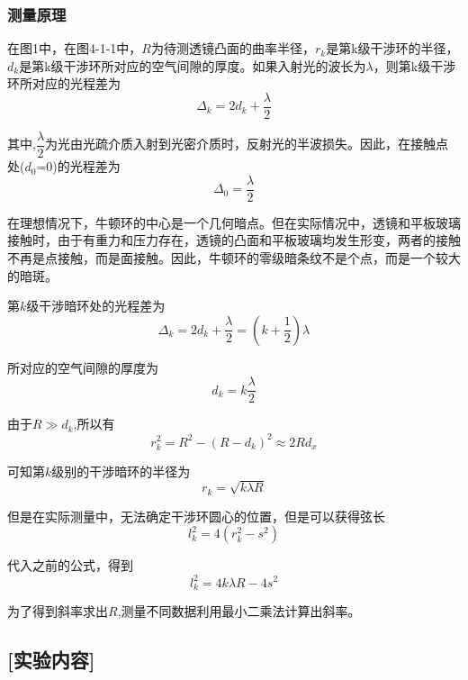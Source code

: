 \documentclass[12pt,a4paper,UTF8]{ctexart}
\begin{document}
\subsubsection*{测量原理}
\par 在图1中，在图4-1-1中，$R$为待测透镜凸面的曲率半径，$r_k$是第k级干涉环的半径，$d_k$是第k级干涉环所对应的空气间隙的厚度。如果入射光的波长为$\lambda$，则第k级干涉环所对应的光程差为
\[
	\Delta_k = 2d_k+\frac{\lambda}{2}
\]
\clearpage
\par 其中,$\dfrac{\lambda}{2}$为光由光疏介质入射到光密介质时，反射光的半波损失。因此，在接触点处($d_0$=0)的光程差为
\[
	\Delta_0 = \frac{\lambda}{2}
\]
\par 在理想情况下，牛顿环的中心是一个几何暗点。但在实际情况中，透镜和平板玻璃接触时，由于有重力和压力存在，透镜的凸面和平板玻璃均发生形变，两者的接触不再是点接触，而是面接触。因此，牛顿环的零级暗条纹不是个点，而是一个较大的暗斑。
\par 第$k$级干涉暗环处的光程差为
\[
	\Delta_k = 2d_k+\frac{\lambda}{2} = (k+\frac{1}{2})\lambda
\]
\par 所对应的空气间隙的厚度为
\[
	d_k = k\frac{\lambda}{2}
\]
\par 由于$R\gg d_k$,所以有
\[
	r_k^2 = R^2-(R-d_k)^2 \approx 2Rd_x
\]
\par 可知第$k$级别的干涉暗环的半径为
\[
	r_k = \sqrt{k\lambda R}
\]
\par 但是在实际测量中，无法确定干涉环圆心的位置，但是可以获得弦长
\[
	l_k^2 = 4(r_k^2-s^2)
\]
\par 代入之前的公式，得到
\[
	l_k^2 = 4k\lambda R-4s^2
\]
\par 为了得到斜率求出$R$,测量不同数据利用最小二乘法计算出斜率。
\subsection*{[实验内容]}
\end{document}

